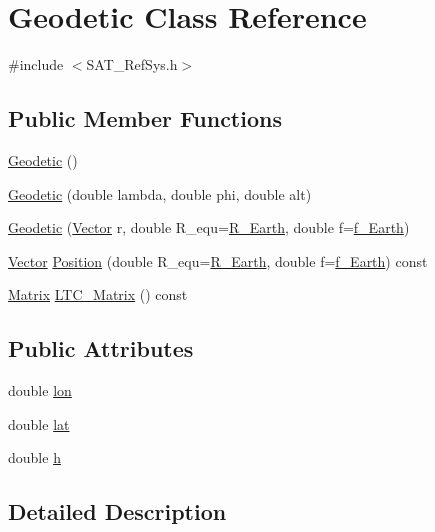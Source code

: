 \hypertarget{classGeodetic}{\section{Geodetic Class Reference}
\label{classGeodetic}
}


{\ttfamily \#include $<$S\-A\-T\-\_\-\-Ref\-Sys.\-h$>$}

\subsection*{Public Member Functions}
\begin{DoxyCompactItemize}
\item 
\hyperlink{classGeodetic_a3f673f6471171da70ef7fb27b90a0737}{Geodetic} ()
\item 
\hyperlink{classGeodetic_ae97afd6fa6138fbe24496f1345ac27fc}{Geodetic} (double lambda, double phi, double alt)
\item 
\hyperlink{classGeodetic_ad813b9417dac1cee7ea962c36b82bb9c}{Geodetic} (\hyperlink{classVector}{Vector} r, double R\-\_\-equ=\hyperlink{SAT__Const_8h_a0232432b945403a113096bb07fa21c09}{R\-\_\-\-Earth}, double f=\hyperlink{SAT__Const_8h_ae88715365ab0f6239981068fc94297c1}{f\-\_\-\-Earth})
\item 
\hyperlink{classVector}{Vector} \hyperlink{classGeodetic_a7c02e1089d2fc2eebd46a20252e78130}{Position} (double R\-\_\-equ=\hyperlink{SAT__Const_8h_a0232432b945403a113096bb07fa21c09}{R\-\_\-\-Earth}, double f=\hyperlink{SAT__Const_8h_ae88715365ab0f6239981068fc94297c1}{f\-\_\-\-Earth}) const 
\item 
\hyperlink{classMatrix}{Matrix} \hyperlink{classGeodetic_a47d84f3c9f36b3443cea7c344fcfbddc}{L\-T\-C\-\_\-\-Matrix} () const 
\end{DoxyCompactItemize}
\subsection*{Public Attributes}
\begin{DoxyCompactItemize}
\item 
double \hyperlink{classGeodetic_a59a979c3f60a77eb5f2ac80f374f7d23}{lon}
\item 
double \hyperlink{classGeodetic_a7e1fb26747be20d8c48009c8d5caa272}{lat}
\item 
double \hyperlink{classGeodetic_a7e0792c8e2f5fa75821a5b0ad94d5242}{h}
\end{DoxyCompactItemize}


\subsection{Detailed Description}



